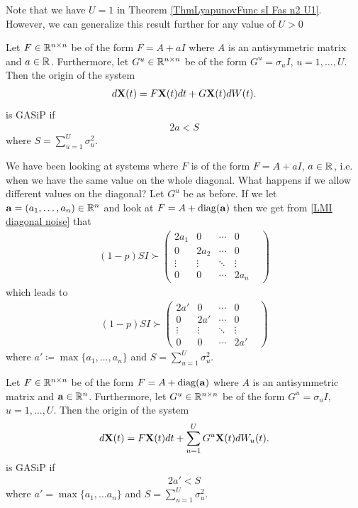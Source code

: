 \documentclass[a4paper,12pt,twoside,BCOR=10mm]{scrbook}
\begin{document}
Note that we have $U = 1$ in Theorem \ref{ThmLyapunovFunc sI Fas n2 U1}. However, we can generalize this result further for any value of $U > 0$

\begin{theorem}
Let $F\in \mathbb{R}^{n\times n}$ be of the form $F = A + aI$ where $A$ is an antisymmetric matrix and $a \in \mathbb{R}^{}$. Furthermore, let $G^u \in \mathbb{R}^{n\times n}$ be of the form $G^u = \sigma_u I$, $u = 1,\ldots, U$. Then the origin of the system
\begin{align*}
    d\mathbf{X}(t) = F\mathbf{X}(t)dt + G\mathbf{X}(t)dW(t).
\end{align*}
is GASiP if
\begin{align*}
    2a < S
\end{align*}
where $S = \sum\limits_{u = 1}^U \sigma_u^2$.
\end{theorem}

We have been looking at systems where $F$ is of the form $F = A + aI$, $a \in \mathbb{R}^{}$, i.e. when we have the same value on the whole diagonal. What happens if we allow different values on the diagonal? Let $G^u$ be as before. If we let $\mathbf{a} = (a_1, \ldots, a_n)\in \mathbb{R}^{n}$ and look at $F = A + \operatorname{diag}(\mathbf{a})$ then we get from \eqref{LMI diagonal noise} that
\begin{align*}
    (1 - p)SI \succ \begin{pmatrix}
    2a_1 & 0 & \cdots & 0\\
    0 & 2a_2 & \cdots & 0\\
    \vdots & \vdots & \ddots & \vdots\\
    0 & 0 & \cdots & 2a_n&
    \end{pmatrix}
\end{align*}
which leads to
\begin{align*}
    (1 - p)SI \succ \begin{pmatrix}
    2a' & 0 & \cdots & 0\\
    0 & 2a' & \cdots & 0\\
    \vdots & \vdots & \ddots & \vdots\\
    0 & 0 & \cdots & 2a'&
    \end{pmatrix}
\end{align*}
where $a' \coloneqq \max\{a_1, \ldots, a_n\}$ and $S = \sum\limits_{u = 1}^U \sigma_u^2$.

\begin{theorem}\label{ThmSpecialCaseAlmennast}
Let $F \in \mathbb{R}^{n\times n}$ be of the form $F = A + \operatorname{diag}(\mathbf{a})$ where $A$ is an antisymmetric matrix and $\mathbf{a}\in\mathbb{R}^{n}$. Furthermore, let $G^u \in \mathbb{R}^{n \times n}$ be of the form $G^u = \sigma_u I$, $u = 1,\ldots, U$. Then the origin of the system
\begin{align*}
    d\mathbf{X}(t) = F\mathbf{X}(t)dt + \sum_{u=1}^U G^u\mathbf{X}(t)dW_u(t).
\end{align*}
is GASiP if
\begin{align*}
    2a' < S
\end{align*}
where $a' = \max\{a_1, \ldots a_n\}$ and $S = \sum\limits_{u = 1}^U \sigma_u^2$.
\end{theorem}
\end{document}
